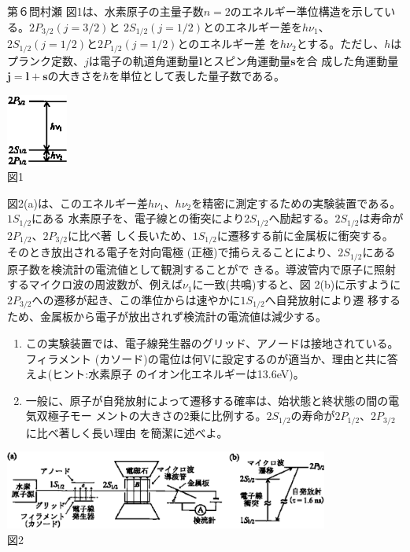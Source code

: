 \begin{question}{第６問}{村瀬}
図1は、水素原子の主量子数$n=2$のエネルギー準位構造を示している。$2P_{3/2}(j=3/2)$と
$2S_{1/2}(j=1/2)$とのエネルギー差を$h\nu_1$、$2S_{1/2}(j=1/2)$と$2P_{1/2}(j=1/2)$とのエネルギー差
を$h\nu_2$とする。ただし、$h$はプランク定数、$j$は電子の軌道角運動量$\bm{l}$とスピン角運動量$\bm{s}$を合
成した角運動量$\bm{j}=\bm{l}+\bm{s}$の大きさを$\hbar$を単位として表した量子数である。
\begin{center}
  \includegraphics[width=0.15\textwidth]{2006physQ6_1r.eps}\\図1
\end{center}
図2(a)は、このエネルギー差$h\nu_1$、$h\nu_2$を精密に測定するための実験装置である。$1S_{1/2}$にある
水素原子を、電子線との衝突により$2S_{1/2}$へ励起する。$2S_{1/2}$は寿命が$2P_{1/2}$、$2P_{3/2}$に比べ著
しく長いため、$1S_{1/2}$に遷移する前に金属板に衝突する。そのとき放出される電子を対向電極
(正極)で捕らえることにより、$2S_{1/2}$にある原子数を検流計の電流値として観測することがで
きる。導波管内で原子に照射するマイクロ波の周波数が、例えば$\nu_1$に一致(共鳴)すると、図
2(b)に示すように$2P_{3/2}$への遷移が起き、この準位からは速やかに$1S_{1/2}$へ自発放射により遷
移するため、金属板から電子が放出されず検流計の電流値は減少する。
\begin{enumerate}
\item
  この実験装置では、電子線発生器のグリッド、アノードは接地されている。フィラメント
  (カソード)の電位は何Vに設定するのが適当か、理由と共に答えよ(ヒント:水素原子
  のイオン化エネルギーは13.6eV)。
\item
  一般に、原子が自発放射によって遷移する確率は、始状態と終状態の間の電気双極子モー
  メントの大きさの2乗に比例する。$2S_{1/2}$の寿命が$2P_{1/2}$、$2P_{3/2}$に比べ著しく長い理由
  を簡潔に述べよ。
\end{enumerate}
\begin{center}
  \includegraphics[width=0.8\textwidth]{2006physQ6_2r.eps}\\図2

\end{center}
\end{question}
